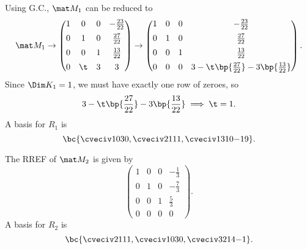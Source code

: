 \begin{solution}
    \begin{ppart}
        Using G.C., $\mat M_1$ can be reduced to \[\mat M_1 \rightarrow \begin{pmatrix}1 & 0 & 0 & -\frac{23}{22} \\[0.5em] 0 & 1 & 0 & \frac{27}{22} \\[0.5em] 0 & 0 & 1 & \frac{13}{22} \\[0.5em] 0 & \t & 3 & 3\end{pmatrix} \rightarrow \begin{pmatrix}1 & 0 & 0 & -\frac{23}{22} \\[0.5em] 0 & 1 & 0 & \frac{27}{22} \\[0.5em] 0 & 0 & 1 & \frac{13}{22} \\[0.5em] 0 & 0 & 0 & 3 - \t \bp{\frac{27}{22}} - 3 \bp{\frac{13}{22}}\end{pmatrix}.\] Since $\Dim K_1 = 1$, we must have exactly one row of zeroes, so \[3 - \t \bp{\frac{27}{22}} - 3 \bp{\frac{13}{22}} \implies \t = 1.\] A basis for $R_1$ is \[\bc{\cveciv1030, \cveciv2111, \cveciv13{10}{-19}}.\]
    \end{ppart}
    \begin{ppart}
        The RREF of $\mat M_2$ is given by \[\begin{pmatrix}1 & 0 & 0 & -\frac13 \\[0.5em] 0 & 1 & 0 & -\frac73 \\[0.5em] 0 & 0 & 1 & \frac53 \\[0.5em] 0 & 0 & 0 & 0\end{pmatrix}.\] A basis for $R_2$ is \[\bc{\cveciv2111, \cveciv1030, \cveciv32{14}{-1}}.\]


\end{ppart}
\end{solution}
